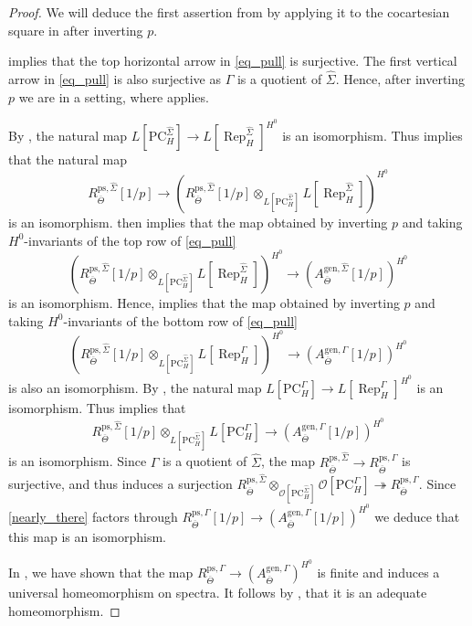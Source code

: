 \documentclass{amsart}
\theoremstyle{definition}
\theoremstyle{remark}
\DeclareMathOperator{\Rep}{Rep}
\newcommand{\OO}{\mathcal O}
\newcommand{\gen}{\mathrm{gen}}
\newcommand{\PC}{\mathrm{PC}}
\newcommand{\Thetabar}{\overline{\Theta}}
\newcommand{\ps}{\mathrm{ps}}
\newcommand{\Sigmahat}{\widehat{\Sigma}}
\begin{document}
\begin{proof}  We will deduce the first assertion 
from  by applying it to the cocartesian 
square in  after inverting $p$. 

 implies that the top horizontal arrow in \eqref{eq_pull} is surjective. The first vertical arrow in \eqref{eq_pull} is also surjective as $\Gamma$ is a quotient of $\Sigmahat$. Hence, after inverting $p$ we are in 
a setting, where  applies. 

By , the natural map $L[\PC^{\Sigmahat}_H] \to L[\Rep^{\Sigmahat}_H]^{H^0}$ is an isomorphism. Thus 
implies that the natural map 
\begin{equation}R^{\ps, \Sigmahat}_{\Thetabar}[1/p]\rightarrow (R^{\ps, \Sigmahat}_{\Thetabar}[1/p]\otimes_{L[\PC^{\Sigmahat}_H]} L[\Rep^{\Sigmahat}_H])^{H^0}
\end{equation}
is an isomorphism.   then 
 implies that the map obtained by inverting
$p$ and taking $H^0$-invariants of the top row of \eqref{eq_pull}
\begin{equation} 
(R^{\ps, \Sigmahat}_{\Thetabar}[1/p]\otimes_{L[\PC^{\Sigmahat}_H]} L[\Rep^{\Sigmahat}_H])^{H^0}\rightarrow
(A^{\gen, \Sigmahat}_{\Thetabar}[1/p])^{H^0}
\end{equation}
is an isomorphism. Hence,  implies that the map obtained by inverting $p$ and taking $H^0$-invariants 
of the bottom row of \eqref{eq_pull} 
\begin{equation}
(R^{\ps, \Sigmahat}_{\Thetabar}[1/p]\otimes_{L[\PC^{\Sigmahat}_H]} L[\Rep^{\Gamma}_H])^{H^0}\rightarrow
(A^{\gen, \Gamma}_{\Thetabar}[1/p])^{H^0}
\end{equation}
is also an isomorphism. By , the natural map $L[\PC^{\Gamma}_H] \to L[\Rep^{\Gamma}_H]^{H^0}$ is an isomorphism. Thus  implies that
\begin{equation}\label{nearly_there}
R^{\ps, \Sigmahat}_{\Thetabar}[1/p]\otimes_{L[\PC^{\Sigmahat}_H]} L[\PC^{\Gamma}_H] \rightarrow (A^{\gen, \Gamma}_{\Thetabar}[1/p])^{H^0}
\end{equation}
is an isomorphism. Since $\Gamma$ is a quotient of $\Sigmahat$, 
the map $R^{\ps, \Sigmahat}_{\Thetabar}\rightarrow R^{\ps, \Gamma}_{\Thetabar}$ is surjective, and thus induces a surjection 
$R^{\ps, \Sigmahat}_{\Thetabar} \otimes_{\OO[\PC^{\Sigmahat}_H]} \OO[\PC^{\Gamma}_H] \twoheadrightarrow R^{\ps, \Gamma}_{\Thetabar}$. 
Since \eqref{nearly_there} factors through 
$R^{\ps, \Gamma}_{\Thetabar}[1/p]\rightarrow (A^{\gen, \Gamma}_{\Thetabar}[1/p])^{H^0}$ we deduce that this map is an isomorphism. 

   
   In \cite[Proposition 7.4]{defG}, we have shown that the map $R^{\ps, \Gamma}_{\Thetabar} \to (A^{\gen, \Gamma}_{\Thetabar})^{H^0}$ is finite and induces a universal homeomorphism on spectra.
    It follows by \cite[Definition 3.3.1]{alper}, that it is an adequate homeomorphism.
\end{proof}
\end{document}
